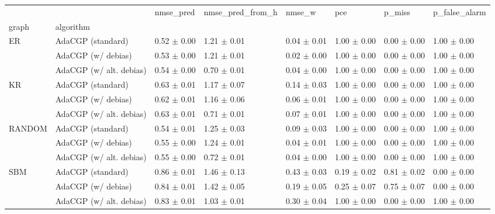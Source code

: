 \begin{tabular}{llllllll}
\toprule
    &                         &        nmse_pred & nmse_pred_from_h &           nmse_w &              pce &           p_miss &    p_false_alarm \\
graph & algorithm &                  &                  &                  &                  &                  &                  \\
\midrule
ER & AdaCGP (standard) &  0.52 $\pm$ 0.00 &  1.21 $\pm$ 0.01 &  0.04 $\pm$ 0.01 &  1.00 $\pm$ 0.00 &  0.00 $\pm$ 0.00 &  1.00 $\pm$ 0.00 \\
    & AdaCGP (w/ debias) &  0.53 $\pm$ 0.00 &  1.21 $\pm$ 0.01 &  0.02 $\pm$ 0.00 &  1.00 $\pm$ 0.00 &  0.00 $\pm$ 0.00 &  1.00 $\pm$ 0.00 \\
    & AdaCGP (w/ alt. debias) &  0.54 $\pm$ 0.00 &  0.70 $\pm$ 0.01 &  0.04 $\pm$ 0.00 &  1.00 $\pm$ 0.00 &  0.00 $\pm$ 0.00 &  1.00 $\pm$ 0.00 \\
KR & AdaCGP (standard) &  0.63 $\pm$ 0.01 &  1.17 $\pm$ 0.07 &  0.14 $\pm$ 0.03 &  1.00 $\pm$ 0.00 &  0.00 $\pm$ 0.00 &  1.00 $\pm$ 0.00 \\
    & AdaCGP (w/ debias) &  0.62 $\pm$ 0.01 &  1.16 $\pm$ 0.06 &  0.06 $\pm$ 0.01 &  1.00 $\pm$ 0.00 &  0.00 $\pm$ 0.00 &  1.00 $\pm$ 0.00 \\
    & AdaCGP (w/ alt. debias) &  0.63 $\pm$ 0.01 &  0.71 $\pm$ 0.01 &  0.07 $\pm$ 0.01 &  1.00 $\pm$ 0.00 &  0.00 $\pm$ 0.00 &  1.00 $\pm$ 0.00 \\
RANDOM & AdaCGP (standard) &  0.54 $\pm$ 0.01 &  1.25 $\pm$ 0.03 &  0.09 $\pm$ 0.03 &  1.00 $\pm$ 0.00 &  0.00 $\pm$ 0.00 &  1.00 $\pm$ 0.00 \\
    & AdaCGP (w/ debias) &  0.55 $\pm$ 0.00 &  1.24 $\pm$ 0.01 &  0.04 $\pm$ 0.01 &  1.00 $\pm$ 0.00 &  0.00 $\pm$ 0.00 &  1.00 $\pm$ 0.00 \\
    & AdaCGP (w/ alt. debias) &  0.55 $\pm$ 0.00 &  0.72 $\pm$ 0.01 &  0.04 $\pm$ 0.00 &  1.00 $\pm$ 0.00 &  0.00 $\pm$ 0.00 &  1.00 $\pm$ 0.00 \\
SBM & AdaCGP (standard) &  0.86 $\pm$ 0.01 &  1.46 $\pm$ 0.13 &  0.43 $\pm$ 0.03 &  0.19 $\pm$ 0.02 &  0.81 $\pm$ 0.02 &  0.00 $\pm$ 0.00 \\
    & AdaCGP (w/ debias) &  0.84 $\pm$ 0.01 &  1.42 $\pm$ 0.05 &  0.19 $\pm$ 0.05 &  0.25 $\pm$ 0.07 &  0.75 $\pm$ 0.07 &  0.00 $\pm$ 0.00 \\
    & AdaCGP (w/ alt. debias) &  0.83 $\pm$ 0.01 &  1.03 $\pm$ 0.01 &  0.30 $\pm$ 0.04 &  1.00 $\pm$ 0.00 &  0.00 $\pm$ 0.00 &  1.00 $\pm$ 0.00 \\
\bottomrule
\end{tabular}
